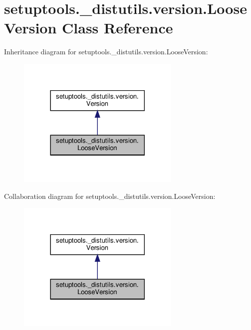 \hypertarget{classsetuptools_1_1__distutils_1_1version_1_1LooseVersion}{}\section{setuptools.\+\_\+distutils.\+version.\+Loose\+Version Class Reference}
\label{classsetuptools_1_1__distutils_1_1version_1_1LooseVersion}


Inheritance diagram for setuptools.\+\_\+distutils.\+version.\+Loose\+Version\+:
\nopagebreak
\begin{figure}[H]
\begin{center}
\leavevmode
\includegraphics[width=221pt]{classsetuptools_1_1__distutils_1_1version_1_1LooseVersion__inherit__graph}
\end{center}
\end{figure}


Collaboration diagram for setuptools.\+\_\+distutils.\+version.\+Loose\+Version\+:
\nopagebreak
\begin{figure}[H]
\begin{center}
\leavevmode
\includegraphics[width=221pt]{classsetuptools_1_1__distutils_1_1version_1_1LooseVersion__coll__graph}
\end{center}
\end{figure}
